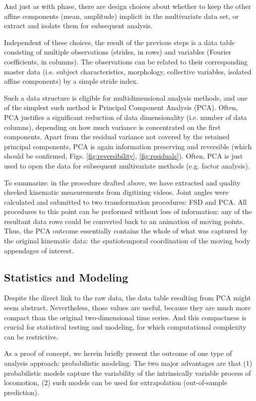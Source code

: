 \documentclass[10pt,a4paper]{article}
\begin{document}
And just as with phase, there are design choices about whether to keep the other affine components (mean, amplitude) implicit in the multivariate data set, or extract and isolate them for subsequent analysis.


Independent of these choices, the result of the previous steps is a data table consisting of multiple observations (strides, in rows) and variables (Fourier coefficients, in columns).
The observations can be related to their corresponding master data (i.e. subject characteristics, morphology, collective variables, isolated affine components) by a simple stride index.

Such a data structure is eligible for multidimensional analysis methods, and one of the simplest such method is Principal Component Analysis (PCA).
Often, PCA justifies a significant reduction of data dimensionality (i.e. number of data columns), depending on how much variance is concentrated on the first components.
Apart from the residual variance not covered by the retained principal components, PCA is again information preserving and reversible (which should be confirmed, Figs. \ref{fig:reversibility}, \ref{fig:residuals}).
Often, PCA is just used to open the data for subsequent multivariate methods (e.g. factor analysis).


To summarize: in the procedure drafted above, we have extracted and quality checked kinematic measurements from digitizing videos.
Joint angles were calculated and submitted to two transformation procedures: FSD and PCA.
All procedures to this point can be performed without loss of information: any of the resultant data rows could be converted back to an animation of moving points.
Thus, the PCA outcome essentially contains the whole of what was captured by the original kinematic data: the spatiotemporal coordination of the moving body appendages of interest.


\subsection{Statistics and Modeling}
\label{sec:org8ddc75a}
Despite the direct link to the raw data, the data table resulting from PCA might seem abstract.
Nevertheless, those values are useful, because they are much more compact than the original two-dimensional time series.
And this compactness is crucial for statistical testing and modeling, for which computational complexity can be restrictive.


As a proof of concept, we herein briefly present the outcome of one type of analysis approach: probabilistic modeling.
The two major advantages are that (1) probabilistic models capture the variability of the intrinsically variable process of locomotion, (2) such models can be used for extrapolation (out-of-sample prediction).
\end{document}
